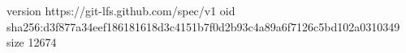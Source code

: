 version https://git-lfs.github.com/spec/v1
oid sha256:d3f877a34eef186181618d3c4151b7f0d2b93c4a89a6f7126c5bd102a0310349
size 12674
